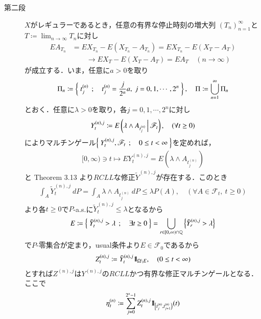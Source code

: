 \begin{prf}
\begin{description}
			\item[第二段]
				$X$がレギュラーであるとき，任意の有界な停止時刻の増大列
				$(T_n)_{n=1}^\infty$と$T \coloneqq \lim_{n \to \infty} T_n$に対し
				\begin{align}
					EA_{T_n} &= EX_{T_n} - E(X_{T_n} - A_{T_n})
					= EX_{T_n} - E(X_T - A_T) \\
					&\qquad \longrightarrow EX_T - E(X_T - A_T)
					= EA_T
					\quad (n \longrightarrow \infty)
				\end{align}
				が成立する．いま，任意に$a > 0$を取り
				\begin{align}
					\Pi_n \coloneqq 
					\Set{t^{(n)}_j}{t^{(n)}_j = \frac{j}{2^n}a,\ j=0,1,\cdots,2^n},
					\quad \Pi \coloneqq \bigcup_{n=1}^\infty \Pi_n
				\end{align}
				とおく．任意に$\lambda > 0$を取り，各$j = 0,1,\cdots,2^n$に対し
				\begin{align}
					Y^{(n),j}_t \coloneqq
					E\left( \lambda \wedge A_{t^{(n)}_j} \, \middle|\, \mathscr{F}_t \right),
					\quad (\forall t \geq 0)
				\end{align}
				によりマルチンゲール$\left\{\ Y^{(n),j}_t,\mathscr{F}_t\ \, ; \quad 0 \leq t < \infty\ \right\}$を定めれば，
				\begin{align}
					[0,\infty) \ni t \longmapsto EY^{(n),j}_t 
					= E\left(\lambda \wedge A_{t^{(n)}_j}\right)
				\end{align}
				と Theorem 3.13 より$RCLL$な修正$\tilde{Y}^{(n),j}$が存在する．このとき
				\begin{align}
					\int_A \tilde{Y}^{(n),j}_t\ dP 
					= \int_A \lambda \wedge A_{t^{(n)}_j}\ dP
					\leq \lambda P(A),
					\quad (\forall A \in \mathscr{F}_t,\ t \geq 0)
				\end{align}
				より各$t \geq 0$で$P$-a.s.に$\tilde{Y}^{(n),j}_t \leq \lambda$となるから
				\begin{align}
					E \coloneqq \left\{\ \tilde{Y}^{(n),j}_t > \lambda\ \, ; \quad \exists t \geq 0\ \right\}
					= \bigcup_{r \in [0,\infty)\cap\mathbb{Q}}\left\{\tilde{Y}^{(n),j}_r > \lambda\right\}
				\end{align}
				で$P$-零集合が定まり，usual条件より$E \in \mathscr{F}_0$であるから
				\begin{align}
					Z^{(n),j}_t \coloneqq \tilde{Y}^{(n),j}_t \mbox{1}\hspace{-0.25em}\mbox{l}_{\Omega \backslash E},
					\quad (0 \leq t < \infty)
				\end{align}
				とすれば$Z^{(n),j}$は$Y^{(n),j}$の$RCLL$かつ有界な修正マルチンゲールとなる．
				ここで
				\begin{align}
					\eta^{(n)}_t \coloneqq
					\sum_{j=0}^{2^n-1} Z^{(n),j}_t \defunc_{\left[t^{(n)}_j,t^{(n)}_{j+1}\right)}(t)

\end{align}
\end{description}
\end{prf}
